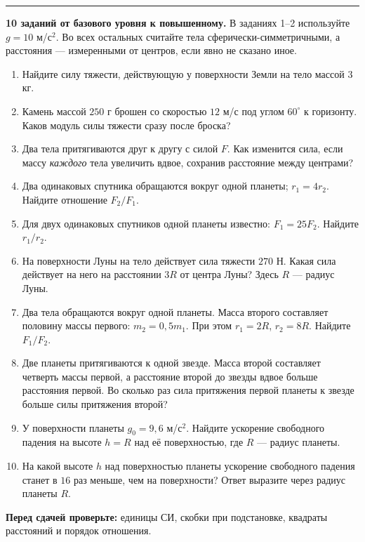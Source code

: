 \documentclass[a4paper,12pt]{article}
\newcommand{\sect}[1]{\vspace{4pt}{\Large\bfseries\color{darkaccent}#1}\par\vspace{3pt}\textcolor{accent!60}{\rule{\linewidth}{0.6pt}}\vspace{2pt}}
\begin{document}
\clearpage
\sect{4. Самостоятельная тренировка \textnormal{(Путь А)}}
\textbf{10 заданий от базового уровня к повышенному.} В заданиях 1--2 используйте $g=10$ м/с$^2$. Во всех остальных считайте тела сферически-симметричными, а расстояния --- измеренными от центров, если явно не сказано иное.
\vspace{2mm}
\begin{enumerate}[label=\textbf{\arabic*.},itemsep=10pt]
\item Найдите силу тяжести, действующую у поверхности Земли на тело массой $3$ кг.
\item Камень массой $250$ г брошен со скоростью $12$ м/с под углом $60^\circ$ к горизонту. Каков модуль силы тяжести сразу после броска?
\item Два тела притягиваются друг к другу с силой $F$. Как изменится сила, если массу \emph{каждого} тела увеличить вдвое, сохранив расстояние между центрами?
\item Два одинаковых спутника обращаются вокруг одной планеты; $r_1=4r_2$. Найдите отношение $F_2/F_1$.
\item Для двух одинаковых спутников одной планеты известно: $F_1=25F_2$. Найдите $r_1/r_2$.
\item На поверхности Луны на тело действует сила тяжести $270$ Н. Какая сила действует на него на расстоянии $3R$ от центра Луны? Здесь $R$ --- радиус Луны.
\item Два тела обращаются вокруг одной планеты. Масса второго составляет половину массы первого: $m_2=0{,}5m_1$. При этом $r_1=2R$, $r_2=8R$. Найдите $F_1/F_2$.
\item Две планеты притягиваются к одной звезде. Масса второй составляет четверть массы первой, а расстояние второй до звезды вдвое больше расстояния первой. Во сколько раз сила притяжения первой планеты к звезде больше силы притяжения второй?
\item У поверхности планеты $g_0=9{,}6$ м/с$^2$. Найдите ускорение свободного падения на высоте $h=R$ над её поверхностью, где $R$ --- радиус планеты.
\item На какой высоте $h$ над поверхностью планеты ускорение свободного падения станет в $16$ раз меньше, чем на поверхности? Ответ выразите через радиус планеты $R$.
\end{enumerate}

\vfill
\textcolor{darkaccent}{\textbf{Перед сдачей проверьте:}} единицы СИ, скобки при подстановке, квадраты расстояний и порядок отношения.
\end{document}
